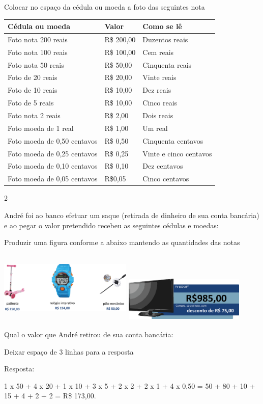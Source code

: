 \begin{escolha}
Colocar no espaço da cédula ou moeda a foto das seguintes nota

\begin{longtable}[]{@{}lll@{}}
\toprule
Cédula ou moeda & Valor & Como se lê\tabularnewline
\midrule
\endhead
Foto nota 200 reais & R\$ 200,00 & Duzentos reais\tabularnewline
Foto nota 100 reais & R\$ 100,00 & Cem reais\tabularnewline
Foto nota 50 reais & R\$ 50,00 & Cinquenta reais\tabularnewline
Foto de 20 reais & R\$ 20,00 & Vinte reais\tabularnewline
Foto de 10 reais & R\$ 10,00 & Dez reais\tabularnewline
Foto de 5 reais & R\$ 10,00 & Cinco reais\tabularnewline
Foto nota 2 reais & R\$ 2,00 & Dois reais\tabularnewline
Foto moeda de 1 real & R\$ 1,00 & Um real\tabularnewline
Foto moeda de 0,50 centavos & R\$ 0,50 & Cinquenta
centavos\tabularnewline
Foto moeda de 0,25 centavos & R\$ 0,25 & Vinte e cinco
centavos\tabularnewline
Foto moeda de 0,10 centavos & R\$ 0,10 & Dez centavos\tabularnewline
Foto moeda de 0,05 centavos & R\$0,05 & Cinco centavos\tabularnewline
\bottomrule
\end{longtable}

\num{2}

André foi ao banco efetuar um saque (retirada de dinheiro de sua conta
bancária) e ao pegar o valor pretendido recebeu as seguintes cédulas e
moedas:

Produzir uma figura conforme a abaixo mantendo as quantidades das notas

\includegraphics[width=2.50022in,height=1.34178in]{media/image72.png}
\includegraphics[width=2.26686in,height=0.87508in]{media/image73.png}

Qual o valor que André retirou de sua conta bancária:

Deixar espaço de 3 linhas para a resposta

Resposta:

1 x 50 + 4 x 20 + 1 x 10 + 3 x 5 + 2 x 2 + 2 x 1 + 4 x 0,50 = 50 + 80 +
10 + 15 + 4 + 2 + 2 = R\$ 173,00.


\end{escolha}
